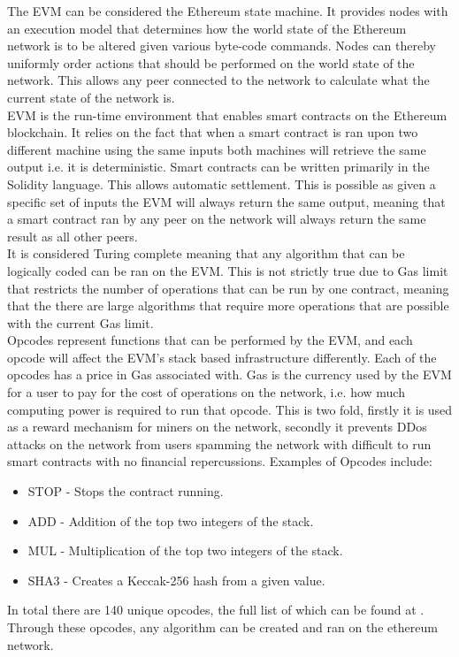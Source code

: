 The EVM can be considered the Ethereum state machine. It provides nodes with an execution model that determines how the world state of the Ethereum network is to be altered given various byte-code commands.  Nodes can thereby uniformly order actions that should be performed on the world state of the network. This allows any peer connected to the network to calculate what the current state of the network is. \\

EVM is the run-time environment that enables smart contracts on the Ethereum blockchain. It relies on the fact that when a smart contract is ran upon two different machine using the same inputs both machines will retrieve the same output i.e. it is deterministic. Smart contracts can be written primarily in the Solidity language. This allows automatic settlement. This is possible as given a specific set of inputs the EVM will always return the same output, meaning that a smart contract ran by any peer on the network will always return the same result as all other peers. \\

It is considered Turing complete meaning that any algorithm that can be logically coded can be ran on the EVM. This is not strictly true due to Gas limit that restricts the number of operations that can be run by one contract, meaning that the there are large algorithms that require more operations that are possible with the current Gas limit.  \\
 

Opcodes represent functions that can be performed by the EVM, and each opcode will affect the EVM's stack based infrastructure differently. Each of the opcodes has a price in Gas associated with. Gas is the currency used by the EVM for a user to pay for the cost of operations on the network, i.e. how much computing power is required to run that opcode. This is two fold, firstly it is used as a reward mechanism for miners on the network, secondly it prevents DDos attacks on the network from users spamming the network with difficult to run smart contracts with no financial repercussions. Examples of Opcodes include:

\begin{itemize}

\item STOP - Stops the contract running.
\item ADD - Addition of the top two integers of the stack.
\item MUL - Multiplication of the top two integers of the stack.
\item SHA3 - Creates a Keccak-256 hash from a given value. 

\end{itemize} 

In total there are 140 unique opcodes, the full list of which can be found at \cite{opcodes}. Through these opcodes, any algorithm can be created and ran on the ethereum network. 